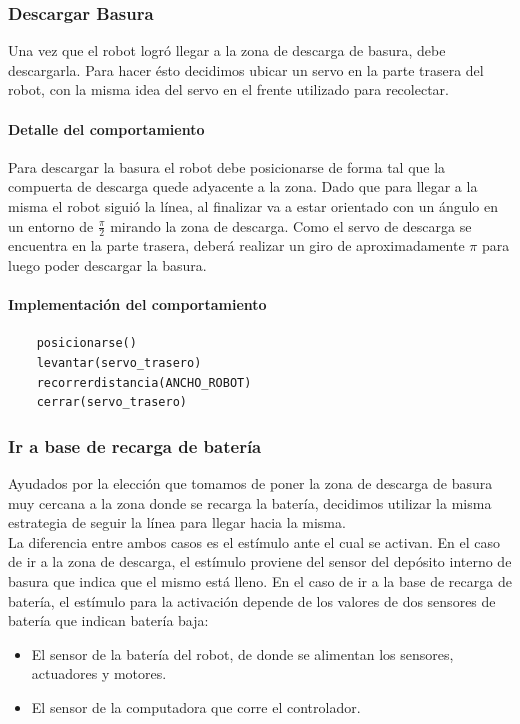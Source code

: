 \subsubsection{Descargar Basura}
\label{unload_garbage}
Una vez que el robot logr\'o llegar a la zona de descarga de basura, debe
descargarla. Para hacer \'esto decidimos ubicar un servo en la parte trasera
del robot, con la misma idea del servo en el frente utilizado para
recolectar.

\paragraph{Detalle del comportamiento}
Para descargar la basura el robot debe posicionarse de forma tal que la
compuerta de descarga quede adyacente a la zona. Dado que para llegar a la
misma el robot sigui\'o la l\'inea, al finalizar va a estar orientado con un
\'angulo en un entorno de $\frac{\pi}{2}$ mirando la zona de descarga. Como el
servo de descarga se encuentra en la parte trasera, deber\'a realizar un giro
de aproximadamente $\pi$ para luego poder descargar la basura.
\paragraph{Implementaci\'on del comportamiento}
\begin{verbatim}
    posicionarse()
    levantar(servo_trasero)
    recorrerdistancia(ANCHO_ROBOT)
    cerrar(servo_trasero)
\end{verbatim}

\subsubsection{Ir a base de recarga de bater\'ia}
\label{go_to_recharge}
Ayudados por la elecci\'on que tomamos de poner la zona de descarga de basura
muy cercana a la zona donde se recarga la bater\'ia, decidimos utilizar la
misma estrategia de seguir la l\'inea para llegar hacia la misma.
\\
La diferencia
entre ambos casos es el est\'imulo ante el cual se activan. En el caso de
ir a la zona de descarga, el est\'imulo proviene del sensor del dep\'osito
interno de basura que indica que el mismo est\'a lleno. En el caso de ir
a la base de recarga de bater\'ia, el est\'imulo para la activaci\'on depende
de los valores de dos sensores de bater\'ia que indican bater\'ia baja:
\begin{itemize}
	\item El sensor de la bater\'ia del robot, de donde se alimentan los sensores,
			actuadores y motores.
	\item El sensor de la computadora que corre el controlador.
\end{itemize}

